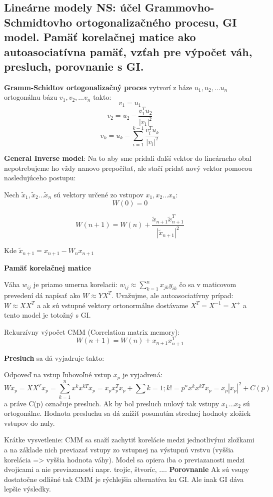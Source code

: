 \documentclass{article}
\numberwithin{equation}{section} %
\begin{document}
\subsection{Lineárne modely NS: účel Grammovho-Schmidtovho ortogonalizačného procesu, GI model. Pamäť korelačnej matice ako autoasociatívna pamäť, vzťah pre výpočet váh, presluch, porovnanie s GI.}

\textbf{Gramm-Schidtov ortogonalizačný proces} vytvorí z báze $u_1, u_2, \dots u_n$ ortogonálnu bázu $v_1, v_2, \dots v_n$ takto:
$$v_1 = u_1$$
$$v_2 = u_2 - \frac{v_1^Tu_2}{|v_1|^2}$$
$$v_k = u_k - \sum_{i=1}^{k-1}{\frac{v_i^Tu_k}{|v_i|^2}}$$

\textbf{General Inverse model}: 
Na to aby sme pridali ďalší vektor do lineárneho obal nepotrebujeme ho vždy nanovo prepočítať, ale stačí pridať nový vektor pomocou nasledujúceho postupu:


Nech $\widetilde{x}_1, \widetilde{x}_2 \dots \widetilde{x}_n$ sú vektory určené zo vstupov $x_1, x_2 \dots x_n$:
$$W(0) = 0$$

$$W(n+1) = W(n) + \frac{\widetilde{x}_{n+1} \widetilde{x}_{n+1}^T}{|\widetilde{x}_{n+1}|^2}$$

Kde $\widetilde{x}_{n+1} = x_{n+1} - W_n x_{n+1}$

\textbf{Pamäť korelačnej matice}

Váha $w_{ij}$ je priamo  umerna korelacii: $w_{ij} \approx \sum_{k=1}^n x_{jk}y_{ik}$ čo sa v maticovom prevedení dá napísať ako $W \approx YX^T$. Uvažujme, ale autoasociatívny prípad: $W \approx X X^T$ a ak sú vstupné vektory ortonormálne dostávame $X^T = X^{-1} = X^+$ a tento model je totožný s GI.

Rekurzívny výpočet CMM (Correlation matrix memory):
$$W(n+1) = W(n) + x_{n+1}  x_{n+1}^T$$

\textbf{Presluch} sa dá vyjadruje takto: 

Odpoveď na vstup ľubovoľné vstup $x_p$ je vyjadrená: $$Wx_p = X X^T x_p = \sum_{k=1}^n x^k x^{kT} x_p = x_p x_p^T x_p + \sum{k=1;k!=p}^n x^k x^{kT} x_p = x_p |x_p|^2 + C(p)$$ a práve C(p) označuje presluch. Ak by bol presluch nulový tak vstupy $x_1 \dots x_2$ sú ortogonálne. Hodnota presluchu sa dá znížiť posunutím strednej hodnoty zložiek vstupov do nuly.

Krátke vysvetlenie: CMM sa snaží zachytiť korelácie medzi jednotlivými zložkami a na základe nich previazať vstupy zo vstupnej na výstupnú vrstvu (vyššia korelácia => vyššia hodnota váhy). Model sa opiera iba o previazanosti medzi dvojicami a nie previazanosti napr. trojíc, štvoríc, .... 
\textbf{Porovnanie}
Ak sú vsupy dostatočne odlišné tak CMM je rýchlejšia alternatíva ku GI. Ale inak GI dáva lepšie výsledky. 
\end{document}
